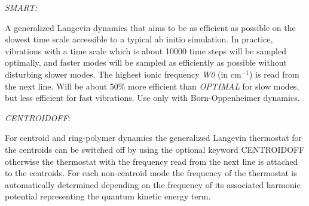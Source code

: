 \documentclass[twoside,10pt,titlepage,a4paper]{article}
\begin{document}
{    {\sl SMART:} \hfill\begin{minipage}[t]{10cm}
                  A generalized Langevin dynamics that aims to be as efficient as possible
                  on the slowest time scale accessible to a typical ab initio simulation. 
                  In practice, vibrations with a time scale which is about 10000 time steps
                  will be sampled optimally, and faster modes will be sampled as efficiently
                  as possible without disturbing slower modes. 
                  The highest ionic frequency {\sl W0} (in cm$^{-1}$) is read from the 
                  next line. Will be about 50\%{} more efficient than {\sl OPTIMAL} for slow
                  modes, but less efficient for fast vibrations. Use only with Born-Oppenheimer
                  dynamics.
                      \end{minipage}

   {\sl CENTROIDOFF:} \hfill\begin{minipage}[t]{10cm}
                 For centroid and ring-polymer dynamics the generalized Langevin thermostat
                 for the centroids can be switched off by using the optional keyword CENTROIDOFF 
                 otherwise the thermostat with the frequency read from the next line is attached 
                 to the centroids. For each non-centroid mode the frequency of the thermostat 
                 is automatically determined depending on the frequency of its associated harmonic 
                 potential representing the quantum kinetic energy term.  
                      \end{minipage}
  }
\end{document}
